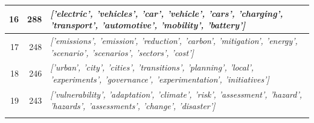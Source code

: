 \documentclass[12pt]{article}
\begin{document}
\begin{landscape}
\begin{table}[]
\begin{tabular}{rrl}
\multicolumn{1}{|r|}{16}             & \multicolumn{1}{r|}{288}            & \multicolumn{1}{l|}{\textit{{[}'electric', 'vehicles', 'car', 'vehicle', 'cars', 'charging', 'transport', 'automotive', 'mobility', 'battery'{]}}}                                   \\ \hline
\multicolumn{1}{|r|}{17}             & \multicolumn{1}{r|}{248}            & \multicolumn{1}{l|}{\textit{{[}'emissions', 'emission', 'reduction', 'carbon', 'mitigation', 'energy', 'scenario', 'scenarios', 'sectors', 'cost'{]}}}                               \\ \hline
\multicolumn{1}{|r|}{18}             & \multicolumn{1}{r|}{246}            & \multicolumn{1}{l|}{\textit{{[}'urban', 'city', 'cities', 'transitions', 'planning', 'local', 'experiments', 'governance', 'experimentation', 'initiatives'{]}}}                     \\ \hline
\multicolumn{1}{|r|}{19}             & \multicolumn{1}{r|}{243}            & \multicolumn{1}{l|}{\textit{{[}'vulnerability', 'adaptation', 'climate', 'risk', 'assessment', 'hazard', 'hazards', 'assessments', 'change', 'disaster'{]}}}                         \\ \hline
\multicolumn{1}{l}{}                 & \multicolumn{1}{l}{}                &                                                                                                                                                                                     
\end{tabular}
\end{table}
\end{landscape}

\end{document}
